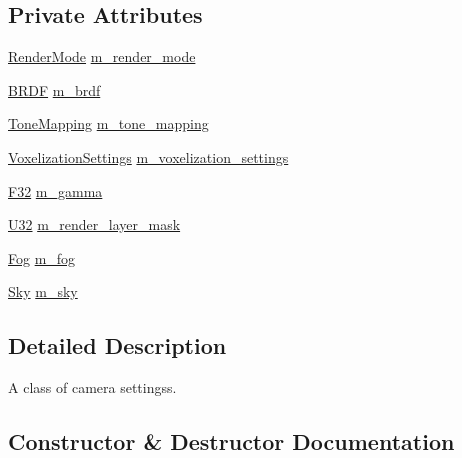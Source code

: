 \subsection*{Private Attributes}
\begin{DoxyCompactItemize}
\item 
\mbox{\hyperlink{namespacemage_1_1rendering_aeb14ce7610cc9391f4e01be027b91dcc}{Render\+Mode}} \mbox{\hyperlink{classmage_1_1rendering_1_1_camera_settings_adf563f8bd1ee5cecd126c6b4731de6e5}{m\+\_\+render\+\_\+mode}}
\item 
\mbox{\hyperlink{namespacemage_1_1rendering_ab8fe8684ca4bd74ba3a394b00cf125b5}{B\+R\+DF}} \mbox{\hyperlink{classmage_1_1rendering_1_1_camera_settings_a18daf9b9c8c7319e7db996a406aa0a43}{m\+\_\+brdf}}
\item 
\mbox{\hyperlink{namespacemage_1_1rendering_a789e4b7d9a8cc831b065e9c6bb7430e9}{Tone\+Mapping}} \mbox{\hyperlink{classmage_1_1rendering_1_1_camera_settings_a5a88df673aa475c5087bf74620048580}{m\+\_\+tone\+\_\+mapping}}
\item 
\mbox{\hyperlink{classmage_1_1rendering_1_1_voxelization_settings}{Voxelization\+Settings}} \mbox{\hyperlink{classmage_1_1rendering_1_1_camera_settings_a4d4cc0955f6bac39a57382a15fe81d64}{m\+\_\+voxelization\+\_\+settings}}
\item 
\mbox{\hyperlink{namespacemage_aa97e833b45f06d60a0a9c4fc22ae02c0}{F32}} \mbox{\hyperlink{classmage_1_1rendering_1_1_camera_settings_aec2e610b98b3657f49944a59c4717bee}{m\+\_\+gamma}}
\item 
\mbox{\hyperlink{namespacemage_a41c104c036fba3756a74e19f793eeaa1}{U32}} \mbox{\hyperlink{classmage_1_1rendering_1_1_camera_settings_ab6d4995fe7531563c5c5c8db1a0a1c9f}{m\+\_\+render\+\_\+layer\+\_\+mask}}
\item 
\mbox{\hyperlink{classmage_1_1rendering_1_1_fog}{Fog}} \mbox{\hyperlink{classmage_1_1rendering_1_1_camera_settings_a173329d1022c717efe29e33eaa554d18}{m\+\_\+fog}}
\item 
\mbox{\hyperlink{classmage_1_1rendering_1_1_sky}{Sky}} \mbox{\hyperlink{classmage_1_1rendering_1_1_camera_settings_a62c726791db2c8ee20ef404e15c5f26c}{m\+\_\+sky}}
\end{DoxyCompactItemize}


\subsection{Detailed Description}
A class of camera settingss. 

\subsection{Constructor \& Destructor Documentation}
\mbox{\label{classmage_1_1rendering_1_1_camera_settings_a46be4ca54bacf2597672a2e944f9fef6}} 
